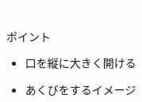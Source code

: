 \documentclass[aspectratio=169,xcolor={dvipsnames,table}]{beamer}
\begin{document}
\begin{frame}
\centering
  \textcolor{white}{\Huge\bfseries Today's Pronunciation}\pause

 \vspace{30pt}

  \textcolor{white}{\Huge\bfseries \textipa{/\textscripta /}}
\end{frame}
\begin{frame}[plain]{\textipa{/\textscripta /}}

\Huge
 \textipa{/\textscripta /}

\vspace*{20pt}

\normalsize
ポイント

\begin{itemize}
 \item 口を縦に大きく開ける
 \item あくびをするイメージ
\end{itemize}
\end{frame}
\end{document}
